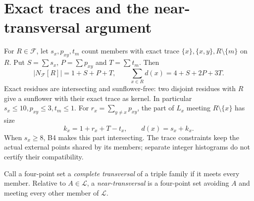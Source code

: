\documentclass[11pt,a4paper]{article}
\numberwithin{equation}{section}
\theoremstyle{remark}
\newcommand{\F}{\mathcal F}
\renewcommand{\L}{\mathcal L}
\begin{document}
\section{Exact traces and the near-transversal argument}
\label{sec:traces}
For $ R\in\F $, let $ s_x,p_{xy},t_m $ count members with exact trace
$\{x\},\{x,y\},R\setminus\{m\}$ on $ R $. Put
$ S=\sum s_x $, $ P=\sum p_{xy}$ and $ T=\sum t_m $. Then
\[
 |N_{\F}[R]|=1+S+P+T,\qquad
 \sum_{x\in R}d(x)=4+S+2P+3T.
\]
Exact residues are intersecting and sunflower-free: two disjoint
residues with $ R $ give a sunflower with their exact trace as
kernel. In particular $ s_x\le 10,p_{xy}\le 3,t_m\le 1$.
For $ r_x=\sum_{y\ne x}p_{xy}$, the part of $ L_x $ meeting
$ R\setminus\{x\}$ has size
\[
 k_x=1+r_x+T-t_x,\qquad d(x)=s_x+k_x.
\]
When $ s_x\ge 8$, B4 makes this part intersecting. The trace
constraints keep the actual external points shared by its members;
separate integer histograms do not certify their compatibility.

Call a four-point set a \emph{complete transversal} of a triple
family if it meets every member. Relative to $ A\in\L $, a
\emph{near-transversal} is a four-point set avoiding $ A $ and
meeting every other member of $\L $.
\end{document}
